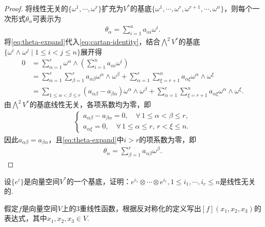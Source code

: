 \documentclass[../../main.tex]{subfiles}%
\begin{document}
\begin{proof}

将线性无关的$\{\omega^1,\cdots,\omega^r\}$扩充为$V^*$的基底$\{\omega^1,\cdots,\omega^r,\omega^{r+1},\cdots,\omega^n\}$，则每个一次形式$\theta_\alpha$可表示为
\begin{align}
\theta_\alpha = \sum\limits_{i=1}^n a_{\alpha i}\omega^i. \label{eq:theta-expand}
\end{align}
将\eqref{eq:theta-expand}代入\eqref{eq:cartan-identity}，结合$\bigwedge^2 V^*$的基底$\{\omega^i\land\omega^j\mid 1\leqslant i<j\leqslant n\}$展开得
\begin{align*}
0 &= \sum\limits_{\alpha=1}^r \omega^\alpha\land\left(\sum\limits_{i=1}^n a_{\alpha i}\omega^i\right) \\
&= \sum\limits_{\alpha=1}^r\sum\limits_{\beta=1}^r a_{\alpha\beta}\omega^\alpha\land\omega^\beta + \sum\limits_{\alpha=1}^r\sum\limits_{\xi=r+1}^n a_{\alpha\xi}\omega^\alpha\land\omega^\xi \\
&= \sum\limits_{1\leqslant\alpha<\beta\leqslant r} (a_{\alpha\beta}-a_{\beta\alpha})\omega^\alpha\land\omega^\beta + \sum\limits_{\alpha=1}^r\sum\limits_{\xi=r+1}^n a_{\alpha\xi}\omega^\alpha\land\omega^\xi.
\end{align*}
由$\bigwedge^2 V^*$的基底线性无关，各项系数均为零，即
\begin{align*}
\begin{cases}
a_{\alpha\beta}-a_{\beta\alpha}=0,\quad \forall\,1\leqslant\alpha<\beta\leqslant r, \\
a_{\alpha\xi}=0,\quad \forall\,1\leqslant\alpha\leqslant r,\,r<\xi\leqslant n.
\end{cases}
\end{align*}
因此$a_{\alpha\beta}=a_{\beta\alpha}$，且\eqref{eq:theta-expand}中$i>r$的项系数为零，即
\begin{align*}
\theta_\alpha = \sum\limits_{\beta=1}^r a_{\alpha\beta}\omega^\beta.
\end{align*}

\end{proof}

\begin{example}
设$\{e^i\}$是向量空间$V^*$的一个基底，证明：$e^{i_1} \otimes \cdots \otimes e^{i_r},1 \leqslant i_1,\cdots,i_r \leqslant n$是线性无关的.
\end{example}

\begin{example}
假定$f$是向量空间$V$上的3重线性函数，根据反对称化的定义写出$[f](x_1,x_2,x_3)$的表达式，其中$x_1,x_2,x_3 \in V$.
\end{example}
\end{document}
